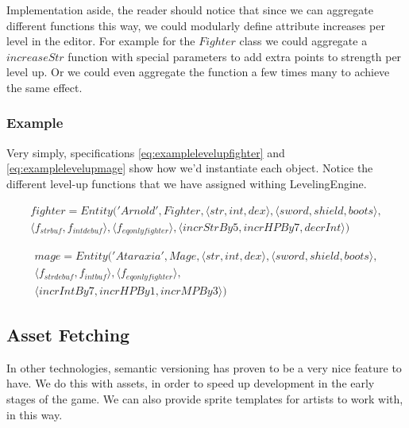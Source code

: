 Implementation aside, the reader should notice that since we can aggregate
different functions this way, we could modularly define attribute increases per
level in the editor. For example for the $Fighter$ class we could aggregate a
$increaseStr$ function with special parameters to add extra points to strength
per level up. Or we could even aggregate the function a few times many to
achieve the same effect.

\subsubsection{Example}

Very simply, specifications \ref{eq:examplelevelupfighter} and
\ref{eq:examplelevelupmage} show how we'd instantiate each object. Notice the
different level-up functions that we have assigned withing LevelingEngine.

\begin{equation}
\begin{split}
  \label{eq:examplelevelupfighter}
  fighter = Entity('Arnold', Fighter, \langle str, int, dex \rangle, \langle sword, shield, boots \rangle, \\
    \langle f_{strbuf}, f_{intdebuf} \rangle,
    \langle f_{eqonlyfighter} \rangle, \langle incrStrBy5, incrHPBy7, decrInt \rangle)
\end{split}
\end{equation}

\begin{equation}
\begin{split}
  \label{eq:examplelevelupmage}
  mage = Entity('Ataraxia', Mage, \langle str, int, dex \rangle, \langle sword, shield, boots \rangle, \\
    \langle f_{strdebuf}, f_{intbuf} \rangle, \langle f_{eqonlyfighter} \rangle, \\
  \langle incrIntBy7, incrHPBy1, incrMPBy3 \rangle)
\end{split}
\end{equation}

\subsection{Asset Fetching} \label{sec:asset-fetch}

In other technologies, semantic versioning has proven to be a very nice feature
to have.  We do this with assets, in order to speed up development in the early
stages of the game.  We can also provide sprite templates for artists to work
with, in this way.

